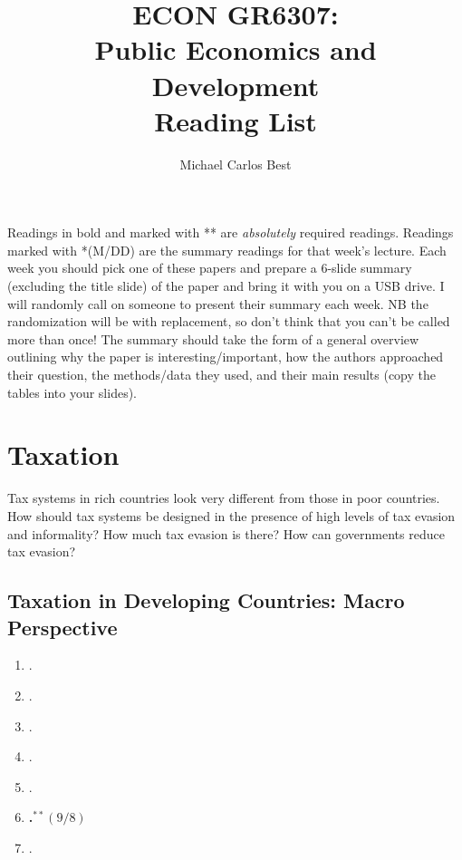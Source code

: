 \documentclass[11pt]{article}
\begin{document}
\title{ECON GR6307: \\ Public Economics and Development \\ Reading List}
\author{Michael Carlos Best}

\maketitle

Readings in bold and marked with ** are \textit{absolutely} required readings. Readings marked with *(M/DD) are the summary readings for that week's lecture. Each week you should pick one of these papers and prepare a 6-slide summary (excluding the title slide) of the paper and bring it with you on a USB drive. I will randomly call on someone to present their summary each week. NB the randomization will be with replacement, so don't think that you can't be called more than once! The summary should take the form of a general overview outlining why the paper is interesting/important, how the authors approached their question, the methods/data they used, and their main results (copy the tables into your slides).

\section{Taxation}
Tax systems in rich countries look very different from those in poor countries. How should tax systems be designed in the presence of high levels of tax evasion and informality? How much tax evasion is there? How can governments reduce tax evasion?

\subsection{Taxation in Developing Countries: Macro Perspective}

\begin{enumerate}
\item {}.
\item {}.
\item {}.
\item {}.
\item {}.
\item \textbf{.$^{**}(9/8)$}
\item {}.
\end{enumerate}
\end{document}
